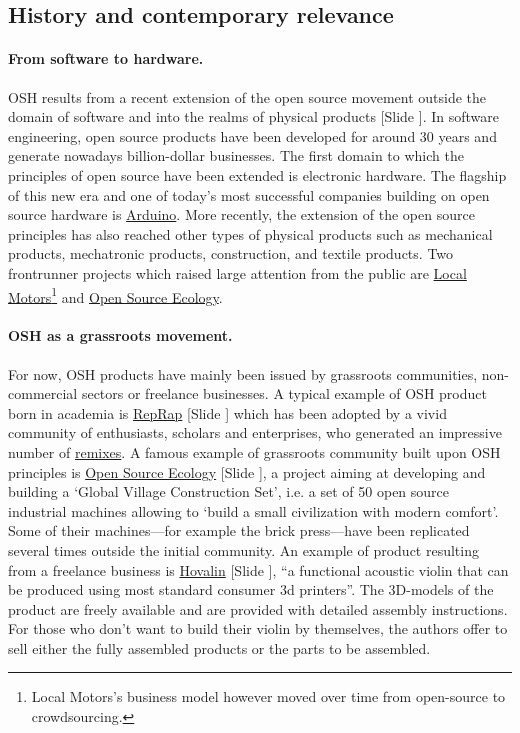 \documentclass{article}
\newcounter{slide}
\begin{document}
\subsection{History and contemporary relevance}
\label{sec:OSHhistory}
\paragraph{From software to hardware.} OSH results from a recent extension of the open source movement outside the domain of software and into the realms of physical products {\color{blue}[Slide ]}. In software engineering, open source products have been developed for around 30 years and generate nowadays billion-dollar businesses. The first domain to which the principles of open source have been extended is electronic hardware. The flagship of this new era and one of today's most successful companies building on open source hardware is \href{https://www.arduino.cc/}{Arduino}. More recently, the extension of the open source principles has also reached other types of physical products such as mechanical products, mechatronic products, construction, and textile products. Two frontrunner projects which raised large attention from the public are \href{https://localmotors.com/}{Local Motors}\footnote{Local Motors's business model however moved over time from open-source to crowdsourcing.} and \href{https://www.opensourceecology.org/}{Open Source Ecology}. 

\paragraph{OSH as a grassroots movement.} For now, OSH products have mainly been issued by grassroots communities, non-commercial sectors or freelance businesses. A typical example of OSH product born in academia is \href{https://reprap.org}{RepRap} {\color{blue}[Slide ]} which has been adopted by a vivid community of enthusiasts, scholars and enterprises, who generated an impressive number of \href{https://reprap.org/wiki/RepRap_Family_Tree}{remixes}. A famous example of grassroots community built upon OSH principles is \href{https://www.opensourceecology.org/}{Open Source Ecology} {\color{blue}[Slide ]}, a project aiming at developing and building a `Global Village Construction Set', i.e. a set of 50 open source industrial machines allowing to `build a small civilization with modern comfort'. Some of their machines---for example the brick press---have been replicated several times outside the initial community. An example of product resulting from a freelance business is \href{http://www.hovalabs.com/hova-instruments/hovalin}{Hovalin} {\color{blue}[Slide ]}, ``a functional acoustic violin that can be produced using most standard consumer 3d printers''. The 3D-models of the product are freely available and are provided with detailed assembly instructions. For those who don't want to build their violin by themselves, the authors offer to sell either the fully assembled products or the parts to be assembled.
\end{document}

